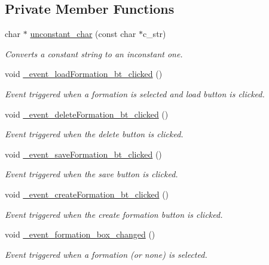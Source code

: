 \subsection*{Private Member Functions}
\begin{DoxyCompactItemize}
\item 
char $\ast$ \hyperlink{class_strategy_g_u_i_a6d19f90621b2b2d6cad000b196e697d9}{unconstant\+\_\+char} (const char $\ast$c\+\_\+str)
\begin{DoxyCompactList}\small\item\em Converts a constant string to an inconstant one. \end{DoxyCompactList}\item 
void \hyperlink{class_strategy_g_u_i_ac0caff70885aad2da169d808d97be3d2}{\+\_\+event\+\_\+load\+Formation\+\_\+bt\+\_\+clicked} ()
\begin{DoxyCompactList}\small\item\em Event triggered when a formation is selected and \textquotesingle{}load\textquotesingle{} button is clicked. \end{DoxyCompactList}\item 
void \hyperlink{class_strategy_g_u_i_a5301539a6dc0b88cf402bf62d372c8fb}{\+\_\+event\+\_\+delete\+Formation\+\_\+bt\+\_\+clicked} ()
\begin{DoxyCompactList}\small\item\em Event triggered when the delete button is clicked. \end{DoxyCompactList}\item 
void \hyperlink{class_strategy_g_u_i_a21327fb17108edba191fa216ec73aafd}{\+\_\+event\+\_\+save\+Formation\+\_\+bt\+\_\+clicked} ()
\begin{DoxyCompactList}\small\item\em Event triggered when the save button is clicked. \end{DoxyCompactList}\item 
void \hyperlink{class_strategy_g_u_i_ada313ae77f231e7007ac83753cbdb5dc}{\+\_\+event\+\_\+create\+Formation\+\_\+bt\+\_\+clicked} ()
\begin{DoxyCompactList}\small\item\em Event triggered when the \textquotesingle{}create formation\textquotesingle{} button is clicked. \end{DoxyCompactList}\item 
void \hyperlink{class_strategy_g_u_i_a3b4da86e02b0e51013801fed1ab9807f}{\+\_\+event\+\_\+formation\+\_\+box\+\_\+changed} ()
\begin{DoxyCompactList}\small\item\em Event triggered when a formation (or none) is selected. \end{DoxyCompactList}\item 

\end{DoxyCompactItemize}
